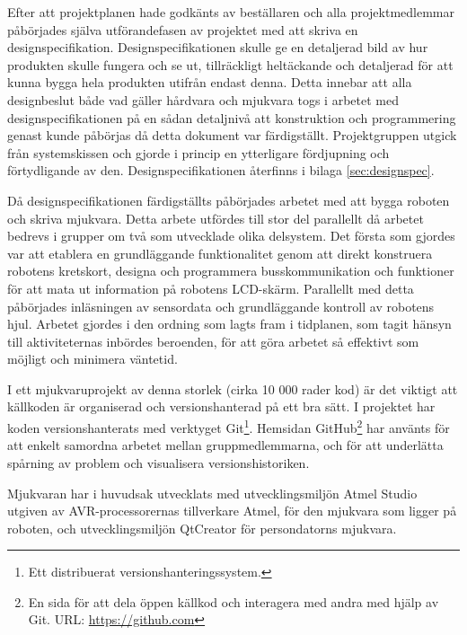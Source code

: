 Efter att projektplanen hade godkänts av beställaren och alla projektmedlemmar påbörjades själva utförandefasen av projektet med att skriva en designspecifikation. Designspecifikationen skulle ge en detaljerad bild av hur produkten skulle fungera och se ut, tillräckligt heltäckande och detaljerad för att kunna bygga hela produkten utifrån endast denna. Detta innebar att alla designbeslut både vad gäller hårdvara och mjukvara togs i arbetet med designspecifikationen på en sådan detaljnivå att konstruktion och programmering genast kunde påbörjas då detta dokument var färdigställt. Projektgruppen utgick från systemskissen och gjorde i princip en ytterligare fördjupning och förtydligande av den. Designspecifikationen återfinns i bilaga \ref{sec:designspec}.

Då designspecifikationen färdigställts påbörjades arbetet med att bygga roboten och skriva mjukvara. Detta arbete utfördes till stor del parallellt då arbetet bedrevs i grupper om två som utvecklade olika delsystem. Det första som gjordes var att etablera en grundläggande funktionalitet genom att direkt konstruera robotens kretskort, designa och programmera busskommunikation och funktioner för att mata ut information på robotens LCD-skärm. Parallellt med detta påbörjades inläsningen av sensordata och grundläggande kontroll av robotens hjul. Arbetet gjordes i den ordning som lagts fram i tidplanen, som tagit hänsyn till aktiviteternas inbördes beroenden, för att göra arbetet så effektivt som möjligt och minimera väntetid. 

I ett mjukvaruprojekt av denna storlek (cirka 10 000 rader kod) är det viktigt att källkoden är organiserad och versionshanterad på ett bra sätt. I projektet har koden versionshanterats med verktyget Git\footnote{Ett distribuerat versionshanteringssystem.}. Hemsidan GitHub\footnote{En sida för att dela öppen källkod och interagera med andra med hjälp av Git. URL: \url{https://github.com}} har använts för att enkelt samordna arbetet mellan gruppmedlemmarna, och för att underlätta spårning av problem och visualisera versionshistoriken.

Mjukvaran har i huvudsak utvecklats med utvecklingsmiljön Atmel Studio utgiven av AVR-processorernas tillverkare Atmel, för den mjukvara som ligger på roboten, och utvecklingsmiljön QtCreator för persondatorns mjukvara.